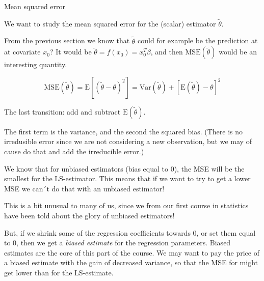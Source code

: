 \documentclass[
  ignorenonframetext,
]{beamer}
\begin{document}
\begin{frame}

\begin{block}{Mean squared error}

We want to study the mean squared error for the (scalar) estimator
\(\tilde{\theta}\).

From the previous section we know that \(\tilde{\theta}\) could for
example be the prediction at at covariate \(x_0\)? It would be
\(\tilde{\theta}=f(x_0)=x_0^T \beta\), and then
\(\text{MSE}(\tilde{\theta})\) would be an interesting quantity.

\[\text{MSE}(\tilde{\theta})= \text{E}[(\tilde{\theta}-\theta)^2]=\text{Var}(\tilde{\theta})+[\text{E}(\tilde{\theta})-\theta]^2\]

The last transition: add and subtract \(\text{E}(\tilde{\theta})\).

The first term is the variance, and the second the squared bias. (There
is no irredusible error since we are not considering a new observation,
but we may of cause do that and add the irreducible error.)

\end{block}

\end{frame}

\begin{frame}

We know that for unbiased estimators (bias equal to \(0\)), the MSE will
be the smallest for the LS-estimator. This means that if we want to try
to get a lower MSE we can´t do that with an unbiased estimator!

This is a bit unusual to many of us, since we from our first course in
statistics have been told about the glory of unbiased estimators!

But, if we shrink some of the regression coefficients towards 0, or set
them equal to 0, then we get a \emph{biased estimate} for the regression
parameters. Biased estimates are the core of this part of the course. We
may want to pay the price of a biased estimate with the gain of
decreased variance, so that the MSE for might get lower than for the
LS-estimate.

\end{frame}
\end{document}
